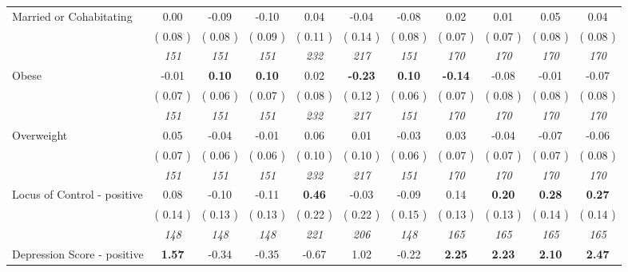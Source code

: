 \begin{tabular}{l c c c c c c c c c c}
Married or Cohabitating &      0.00 &     -0.09 &     -0.10 &      0.04 &     -0.04 &     -0.08 &      0.02 &      0.01 &      0.05 &      0.04 \\
& (     0.08 ) & (     0.08 ) & (     0.09 ) & (     0.11 ) & (     0.14 ) & (     0.08 ) & (     0.07 ) & (     0.07 ) & (     0.08 ) & (     0.08 ) \\
& \textit{ 151 } & \textit{ 151 } & \textit{ 151 } & \textit{ 232 } & \textit{ 217 } & \textit{ 151 } & \textit{ 170 } & \textit{ 170 } & \textit{ 170 } & \textit{ 170 } \\
Obese &     -0.01 & \textbf{      0.10 } & \textbf{      0.10 } &      0.02 & \textbf{     -0.23 } & \textbf{     0.10} & \textbf{     -0.14 } &     -0.08 &     -0.01 &     -0.07 \\
& (     0.07 ) & (     0.06 ) & (     0.07 ) & (     0.08 ) & (     0.12 ) & (     0.06 ) & (     0.07 ) & (     0.08 ) & (     0.08 ) & (     0.08 ) \\
& \textit{ 151 } & \textit{ 151 } & \textit{ 151 } & \textit{ 232 } & \textit{ 217 } & \textit{ 151 } & \textit{ 170 } & \textit{ 170 } & \textit{ 170 } & \textit{ 170 } \\
Overweight &      0.05 &     -0.04 &     -0.01 &      0.06 &      0.01 &     -0.03 &      0.03 &     -0.04 &     -0.07 &     -0.06 \\
& (     0.07 ) & (     0.06 ) & (     0.06 ) & (     0.10 ) & (     0.10 ) & (     0.06 ) & (     0.07 ) & (     0.07 ) & (     0.07 ) & (     0.08 ) \\
& \textit{ 151 } & \textit{ 151 } & \textit{ 151 } & \textit{ 232 } & \textit{ 217 } & \textit{ 151 } & \textit{ 170 } & \textit{ 170 } & \textit{ 170 } & \textit{ 170 } \\
Locus of Control - positive &      0.08 &     -0.10 &     -0.11 & \textbf{      0.46 } &     -0.03 &     -0.09 &      0.14 & \textbf{      0.20 } & \textbf{      0.28 } & \textbf{     0.27} \\
& (     0.14 ) & (     0.13 ) & (     0.13 ) & (     0.22 ) & (     0.22 ) & (     0.15 ) & (     0.13 ) & (     0.13 ) & (     0.14 ) & (     0.14 ) \\
& \textit{ 148 } & \textit{ 148 } & \textit{ 148 } & \textit{ 221 } & \textit{ 206 } & \textit{ 148 } & \textit{ 165 } & \textit{ 165 } & \textit{ 165 } & \textit{ 165 } \\
Depression Score - positive & \textbf{      1.57 } &     -0.34 &     -0.35 &     -0.67 &      1.02 &     -0.22 & \textbf{      2.25 } & \textbf{      2.23 } & \textbf{      2.10 } & \textbf{     2.47} \\

\end{tabular}
